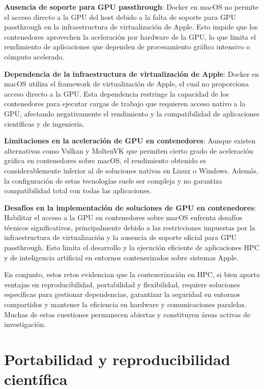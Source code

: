 \textbf{Ausencia de soporte para GPU passthrough}: Docker en macOS no permite el acceso directo a la GPU del host debido a la falta de soporte para GPU passthrough en la infraestructura de virtualización de Apple. Esto impide que los contenedores aprovechen la aceleración por hardware de la GPU, lo que limita el rendimiento de aplicaciones que dependen de procesamiento gráfico intensivo o cómputo acelerado.

\textbf{Dependencia de la infraestructura de virtualización de Apple}: Docker en macOS utiliza el framework de virtualización de Apple, el cual no proporciona acceso directo a la GPU. Esta dependencia restringe la capacidad de los contenedores para ejecutar cargas de trabajo que requieren acceso nativo a la GPU, afectando negativamente el rendimiento y la compatibilidad de aplicaciones científicas y de ingeniería.

\textbf{Limitaciones en la aceleración de GPU en contenedores}: Aunque existen alternativas como Vulkan y MoltenVK que permiten cierto grado de aceleración gráfica en contenedores sobre macOS, el rendimiento obtenido es considerablemente inferior al de soluciones nativas en Linux o Windows. Además, la configuración de estas tecnologías suele ser compleja y no garantiza compatibilidad total con todas las aplicaciones.

\textbf{Desafíos en la implementación de soluciones de GPU en contenedores}: Habilitar el acceso a la GPU en contenedores sobre macOS enfrenta desafíos técnicos significativos, principalmente debido a las restricciones impuestas por la infraestructura de virtualización y la ausencia de soporte oficial para GPU passthrough. Esto limita el desarrollo y la ejecución eficiente de aplicaciones HPC y de inteligencia artificial en entornos contenerizados sobre sistemas Apple.

En conjunto, estos retos evidencian que la contenerización en HPC, si bien aporta ventajas en reproducibilidad, portabilidad y flexibilidad, requiere soluciones específicas para gestionar dependencias, garantizar la seguridad en entornos compartidos y mantener la eficiencia en hardware y comunicaciones paralelas. Muchas de estas cuestiones permanecen abiertas y constituyen áreas activas de investigación.

\section{Portabilidad y reproducibilidad científica}\label{sec:portabilidad_reproducibilidad}


